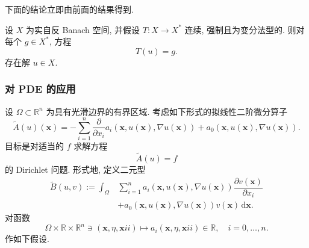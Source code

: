 下面的结论立即由前面的结果得到.

\begin{Corollary}
\label{cor:cv-type-surjectivity}
设 $X$ 为实自反 Banach 空间, 并假设 $T:X\to X^*$ 连续, 强制且为变分法型的. 则对每个 $g\in X^*$, 方程
\begin{equation}\label{eq:calculus-variations-type-surjectivity-equation}
T(u)=g.
\end{equation}
存在解 $u\in X$.
\end{Corollary}

\subsubsection{对 PDE 的应用}\label{subsec:cv-type-application-to-pdes}

设 $\Omega\subset\mathbb{R}^n$ 为具有光滑边界的有界区域. 考虑如下形式的拟线性二阶微分算子
\begin{equation}\label{eq:cv-quasilinear-second-order-operator}
\widetilde A(u)(\bm{x})=-\sum_{i=1}^n\dfrac{\partial}{\partial x_i}a_i(\bm{x},u(\bm{x}),\nabla u(\bm{x}))+a_0(\bm{x},u(\bm{x}),\nabla u(\bm{x})).
\end{equation}
目标是对适当的 $f$ 求解方程
\begin{equation}\label{eq:cv-quasilinear-dirichlet-equation}
\widetilde A(u)=f
\end{equation}
的 Dirichlet 问题. 形式地, 定义二元型
\begin{equation}\label{eq:cv-quasilinear-bivariate-form}
\begin{aligned}\widetilde B(u,v):=\int_\Omega&\sum_{i=1}^n a_i(\bm{x},u(\bm{x}),\nabla u(\bm{x}))\dfrac{\partial v(\bm{x})}{\partial x_i}\\&+a_0(\bm{x},u(\bm{x}),\nabla u(\bm{x}))v(\bm{x})\,\mathrm{d}\bm{x}.\end{aligned}
\end{equation}
对函数
\begin{equation}\label{eq:cv-pde-coefficient-functions-domain}
\Omega\times\mathbb{R}\times\mathbb{R}^n\ni(\bm{x},\eta,\bm{x}ii)\mapsto a_i(\bm{x},\eta,\bm{x}ii)\in\mathbb{R},\quad i=0,\ldots,n.
\end{equation}
作如下假设.

